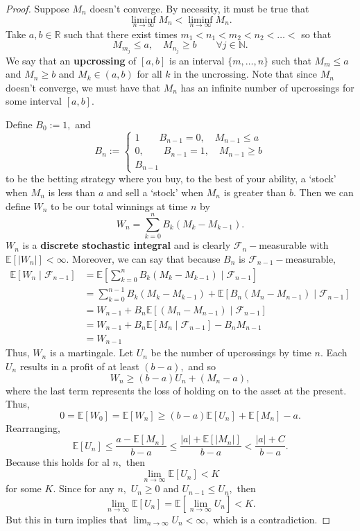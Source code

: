 \documentclass[10pt, oneside]{article}
\newcommand{\bbR}{\mathbb{R}}
\newcommand{\bbN}{\mathbb{N}}
\newcommand{\bbE}{\mathbb{E}}
\theoremstyle{definition}
\begin{document}
\begin{proof}
    Suppose $M_n$ doesn't converge. By necessity, it must be true that 
    \[\liminf_{n\to \infty}M_n < \liminf_{n\to \infty}M_n.\] Take $a,b \in \bbR$ such that there exist times $m_1 < n_1 < m_2 < n_2 < \dots< $ so that 
    \[M_{m_j} \leq a, \quad M_{n_j} \geq b \qquad \forall j \in \bbN.\] We say that an \textbf{upcrossing} of $[a,b]$ is an interval $\{m, \dots, n\}$ such that $M_{m} \leq a$ and $M_n \geq b$ and $M_k \in (a,b)$ for all $k$ in the uncrossing. Note that since $M_n$ doesn't converge, we must have that $M_n$ has an infinite number of upcrossings for some interval $[a,b].$
    
    Define $B_0:=1,$ and
    \[B_n:= \begin{cases}
        1 \qquad B_{n-1} = 0, \quad M_{n-1}\leq a\\
        0, \qquad B_{n-1} = 1, \quad M_{n-1} \geq b\\
        B_{n-1}
    \end{cases}\] to be the betting strategy where you buy, to the best of your ability, a `stock' when $M_n$ is less than $a$ and sell a `stock' when  $M_n$ is greater than $b.$ Then we can define $W_n$ to be our total winnings at time $n$ by 
    \[W_n = \sum_{k=0}^n B_k (M_k - M_{k-1}).\] $W_n$ is a \textbf{discrete stochastic integral} and is clearly $\mathcal{F}_n-$measurable with $\bbE[|W_n|] < \infty.$ Moreover, we can say that because $B_n$ is $\mathcal{F}_{n-1}-$measurable, 
    \begin{align*}
        \bbE[W_n \mid \mathcal{F}_{n-1}] &= \bbE\left[\sum_{k=0}^n B_k(M_{k} - M_{k-1})\mid \mathcal{F}_{n-1}\right]\\
        &= \sum_{k=0}^{n-1} B_k(M_{k} - M_{k-1}) + \bbE[B_n (M_n - M_{n-1})\mid \mathcal{F}_{n-1}]\\
        &= W_{n-1} + B_n\bbE[ (M_n - M_{n-1})\mid \mathcal{F}_{n-1}]\\
        &= W_{n-1} + B_n\bbE[M_n\mid \mathcal{F}_{n-1}] - B_n M_{n-1}\\
        &= W_{n-1}
    \end{align*}
    Thus, $W_n$ is a martingale. Let $U_n$ be the number of upcrossings by time $n.$ Each $U_n$ results in a profit of at least $(b-a),$ and so 
    \[W_n \geq (b-a) U_n + (M_n - a),\] where the last term represents the loss of holding on to the asset at the present. Thus, 
    \[0 =\bbE[W_0]= \bbE[W_n] \geq (b-a)\bbE[U_n] + \bbE[M_n]- a.\] Rearranging,
    \[\bbE[U_n] \leq \frac{a - \bbE[M_n]}{b-a} \leq \frac{|a| + \bbE[|M_n|]}{b-a} < \frac{|a|  + C}{b-a}.\] Because this holds for al $n,$ then 
    \[\lim_{n\to \infty}\bbE[U_n] < K\] for some $K.$ Since for any $n,$ $U_n \geq 0$ and $U_{n-1} \leq U_n,$ then 
    \[\lim_{n\to \infty}\bbE[U_n] = \bbE[\lim_{n \to \infty} U_n] < K.\] But this in turn implies that $\lim_{n\to \infty}U_n < \infty,$ which is a contradiction. 
\end{proof}
\end{document}
